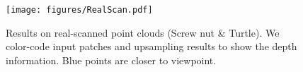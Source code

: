 \begin{figure}[h]
	\centering
	\texttt{[image: figures/RealScan.pdf]}\vspace{1mm}
	\caption{Results on real-scanned point clouds (Screw nut \& Turtle). We color-code input patches and upsampling results to show the depth information. Blue points are closer to viewpoint.}
	\label{fig:realscan}\vspace{-2mm}
\end{figure}
